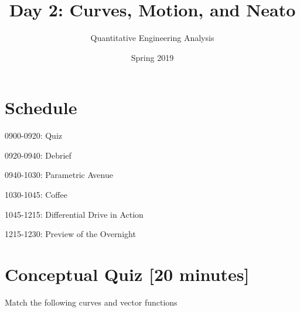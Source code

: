\documentclass{tufte-handout}
\title{Day 2: Curves, Motion, and Neato}
\author{Quantitative Engineering Analysis}
\date{Spring 2019}
\begin{document}
\maketitle
\thispagestyle{firstpage}

\section{Schedule}
\bi
\item 0900-0920: Quiz
\item 0920-0940: Debrief
\item 0940-1030: Parametric Avenue
\item 1030-1045: Coffee
\item 1045-1215: Differential Drive in Action
\item 1215-1230: Preview of the Overnight
\ei

\section{Conceptual Quiz [20 minutes]}

\be
\item Match the following curves and vector functions
\end{document}

